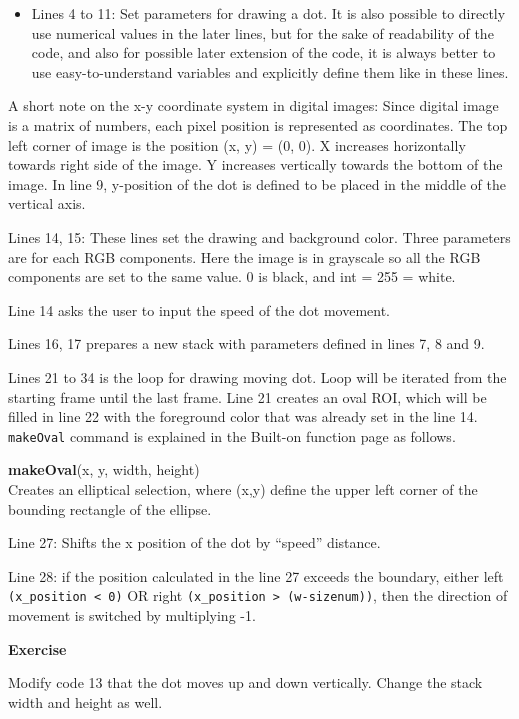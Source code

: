 \documentclass[11pt,a4paper,oneside]{report}
\newenvironment{indentexercise}[1]%
{{\setlength{\leftmargin}{2em}}%
\textbf{Exercise \thesubsection-#1}%
\begin{list}{}%
	\item%
}
{\end{list}}
\newenvironment{indentCom}%
{\begin{list}{}%
         {\setlength{\leftmargin}{1em}}%
         \item[]%
}
{\end{list}}
\newcommand{\ilcom}[1]{\texttt{\small#1}}
\begin{document}
\begin{itemize}
\item Lines 4 to 11: Set parameters for drawing a dot. It is also possible to directly use numerical values in the later lines, but for the sake of readability of the code, and also for possible later extension of the code, it is always better to use easy-to-understand variables and explicitly define them like in these lines. 
\end{itemize}
A short note on the x-y coordinate system in digital images: Since digital image is a matrix of numbers, each pixel position is represented as coordinates. The top left corner of image is the position (x, y) = (0, 0). X increases horizontally towards right side of the image. Y increases vertically towards the bottom of the image.  In line 9, y-position of the dot is defined to be placed in the middle of the vertical axis. 
\begin{itemize}
\item Lines 14, 15: These lines set the drawing and background color. Three parameters are for each RGB components. Here the image is in grayscale so all the RGB components are set to the same value. 0 is black, and int = 255 = white.
\item Line 14 asks the user to input the speed of the dot movement.
\item Lines 16, 17 prepares a new stack with parameters defined in lines 7, 8 and 9.
\item Lines 21 to 34 is the loop for drawing moving dot. Loop will be iterated from the starting frame until the last frame. Line 21 creates an oval ROI, which will be filled in line 22 with the foreground color that was already set in the line 14. \ilcom{makeOval} command is explained in the Built-on function page as follows.

\begin{indentCom}
\textbf{makeOval}(x, y, width, height)\\
Creates an elliptical selection, where (x,y) define the upper left corner of the bounding rectangle of the ellipse. 
\end{indentCom}
\item Line 27: Shifts the x position of the dot by ``speed'' distance. 
\item Line 28: if the position calculated in the line 27 exceeds the boundary, either left \ilcom{(x\_position < 0)} OR right \ilcom{(x\_position > (w-sizenum))}, then the direction of movement is switched by multiplying -1.
\end{itemize}
\begin{indentexercise}{1}
Modify code 13 that the dot moves up and down vertically. Change the stack width and height as well. 
\end{indentexercise}
\end{document}

